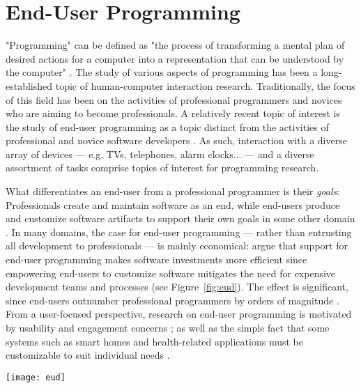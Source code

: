 \section{End-User Programming}
\label{sec:end-user-programming}

"Programming" can be defined as "the process of transforming a mental plan of desired actions for a computer into a representation that can be understood by the computer" \parencite{Myers:2006}. The study of various aspects of programming has been a long-established topic of human-computer interaction research. Traditionally, the focus of this field has been on the activities of professional programmers and novices who are aiming to become professionals. A relatively recent topic of interest is the study of end-user programming as a topic distinct from the activities of professional and novice software developers \parencite{Myers:2006}. As such, interaction with a diverse array of devices --- e.g. TVs, telephones, alarm clocks... --- and a diverse assortment of tasks comprise topics of interest for programming research.

What differentiates an end-user from a professional programmer is their \emph{goals}: Professionals create and maintain software as an end, while end-users produce and customize software artifacts to support their own goals in some other domain \parencite{Ko:2011}. In many domains, the case for end-user programming --- rather than entrusting all development to professionals --- is mainly economical:  \textcite{Wulf:2004} argue that support for end-user programming makes software investments more efficient since empowering end-users to customize software mitigates the need for expensive development teams and processes (see Figure~\ref{fig:eud}). The effect is significant, since end-users outnumber professional programmers by orders of magnitude \parencite{Scaffidi:2005}. From a user-focused perspective, research on end-user programming is motivated by usability and engagement concerns \parencite{Germonprez:2007}; as well as the simple fact that some systems such as smart homes \parencite{Blackwell:2004} and health-related applications \parencite{Rizzo:2011, Lange:2011} must be customizable to suit individual needs \parencite{Holloway:2010}.

\begin{SCfigure}[\sidecaptionrelwidth][t]
\centering
\texttt{[image: eud]}
\caption{Comparing the cost structure for software development, adaptation and appropriation with and without end-user programming support. Adapted from \textcite{Wulf:2004}.}
\label{fig:eud}
\end{SCfigure}

